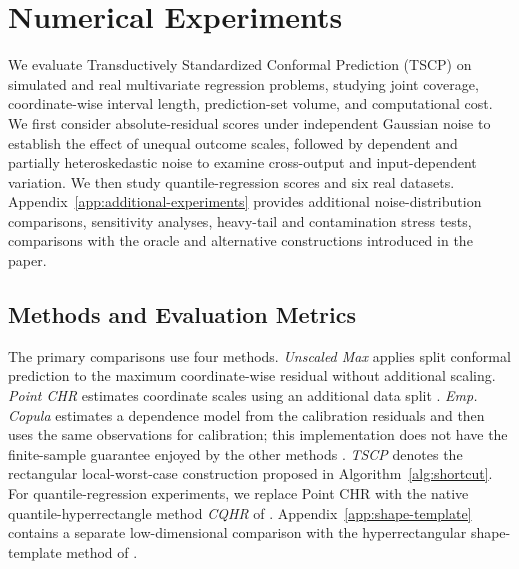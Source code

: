 
\begingroup
\color{blue}
\setlength{\emergencystretch}{2em}

\FloatBarrier
\section{Numerical Experiments}
\label{sec:numerical-experiments}
\label{sec:experiments}

We evaluate Transductively Standardized Conformal Prediction (TSCP) on
simulated and real multivariate regression problems, studying joint coverage,
coordinate-wise interval length, prediction-set volume, and computational cost. 
We first consider absolute-residual scores under independent Gaussian noise
to establish the effect of unequal outcome scales, followed by dependent
and partially heteroskedastic noise to examine cross-output and
input-dependent variation. We then study quantile-regression scores and
six real datasets. Appendix~\ref{app:additional-experiments} provides
additional noise-distribution comparisons, sensitivity analyses, heavy-tail
and contamination stress tests, comparisons with the oracle and
alternative constructions introduced in the paper.

\subsection{Methods and Evaluation Metrics}
\label{sec:experiment-methods}

The primary comparisons use four methods. \emph{Unscaled Max} applies split
conformal prediction to the maximum coordinate-wise residual without
additional scaling. \emph{Point CHR} estimates coordinate scales using an
additional data split \citep{sampson2024conformal}. \emph{Emp.
Copula} estimates a dependence model from the calibration residuals and then
uses the same observations for calibration; this implementation does not have
the finite-sample guarantee enjoyed by the other methods
\citep{messoudi2021copula}. \emph{TSCP} denotes
the rectangular local-worst-case construction proposed in Algorithm~\ref{alg:shortcut}. For
quantile-regression experiments, we replace Point CHR with the native
quantile-hyperrectangle method \emph{CQHR} of
\citet{sampson2024conformal}. Appendix~\ref{app:shape-template} contains a
separate low-dimensional comparison with the hyperrectangular shape-template
method of \citet{tumu2024templates}.

